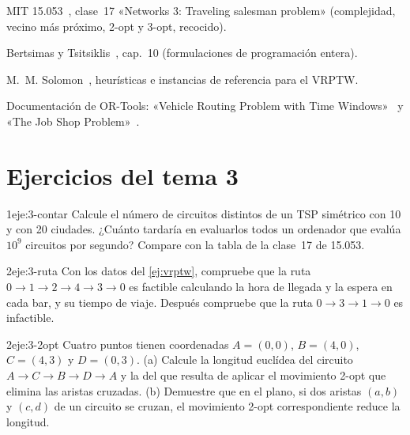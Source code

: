 \begin{lecturas}
\item MIT 15.053~\cite{mit15053}, clase~17 «Networks 3: Traveling salesman problem» (complejidad, vecino más próximo, 2-opt y 3-opt, recocido).
\item Bertsimas y Tsitsiklis~\cite{bt}, cap.~10 (formulaciones de programación entera).
\item M.~M. Solomon~\cite{solomon}, heurísticas e instancias de referencia para el VRPTW.
\item Documentación de OR-Tools: «Vehicle Routing Problem with Time Windows»~\cite{ortools-vrptw} y «The Job Shop Problem»~\cite{ortools-js}.
\end{lecturas}

\section*{Ejercicios del tema 3}

\begin{ejercicio}{1}{eje:3-contar}
Calcule el número de circuitos distintos de un TSP simétrico con 10 y con 20 ciudades. ¿Cuánto tardaría en evaluarlos todos un ordenador que evalúa $10^{9}$ circuitos por segundo? Compare con la tabla de la clase~17 de 15.053.
\end{ejercicio}

\begin{ejercicio}{2}{eje:3-ruta}
Con los datos del \cref{ej:vrptw}, compruebe que la ruta $0\to 1\to 2\to 4\to 3\to 0$ es factible calculando la hora de llegada y la espera en cada bar, y su tiempo de viaje. Después compruebe que la ruta $0\to 3\to 1\to 0$ es infactible.
\end{ejercicio}

\begin{ejercicio}{2}{eje:3-2opt}
Cuatro puntos tienen coordenadas $A=(0,0)$, $B=(4,0)$, $C=(4,3)$ y $D=(0,3)$. (a) Calcule la longitud euclídea del circuito $A\to C\to B\to D\to A$ y la del que resulta de aplicar el movimiento 2-opt que elimina las aristas cruzadas. (b) Demuestre que en el plano, si dos aristas $(a,b)$ y $(c,d)$ de un circuito se cruzan, el movimiento 2-opt correspondiente reduce la longitud.
\end{ejercicio}

